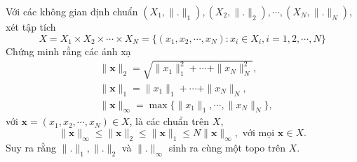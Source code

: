 \begin{exercise}{10}
    Với các không gian định chuẩn $(X_1, \|.\|_1), (X_2, \|.\|_2), \cdots, (X_N, \|.\|_N)$, xét tập tích
    $$
        X = X_1 \times X_2 \times \cdots \times X_N = \{ (x_1,x_2,\cdots,x_N): x_i \in X_i, i = 1,2,\cdots,N \}
    $$
    Chứng minh rằng các ánh xạ
    \begin{align*}
        &\|\mathbf{x}\|_2 = \sqrt{\|x_1\|_1^2 + \cdots + \|x_N\|_N^2},\\
        &\|\mathbf{x}\|_1 = \|x_1\|_1 + \cdots + \|x_N\|_N,\\
        &\|\mathbf{x}\|_{\infty} = \max\{\|x_1\|_1, \cdots, \|x_N\|_N\},
    \end{align*}
    với $\mathbf{x} = (x_1,x_2,\cdots,x_N) \in X$, là các chuẩn trên $X$,
    $$
        \|\mathbf{x}\|_{\infty} \leq \|\mathbf{x}\|_{2} \leq \|\mathbf{x}\|_{1} \leq N \|\mathbf{x}\|_{\infty}, \text{ với mọi } \mathbf{x} \in X.
    $$
    Suy ra rằng $\|.\|_1, \|.\|_2$ và $\|.\|_{\infty}$ sinh ra cùng một topo trên $X$.
\end{exercise}

